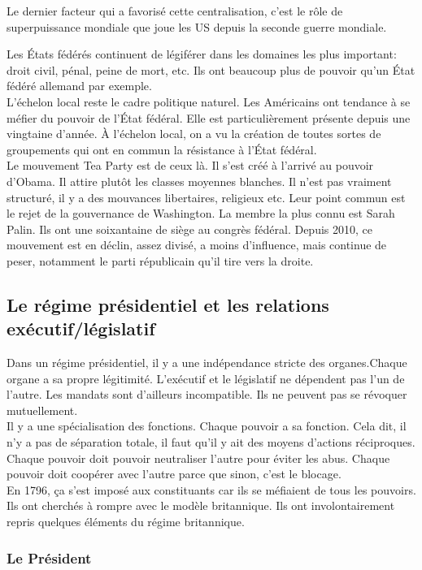 \documentclass[10pt, a4paper, openany]{book}
\begin{document}
Le dernier facteur qui a favorisé cette centralisation, c'est le rôle de superpuissance mondiale que joue les US depuis la seconde guerre mondiale. 


Les États fédérés continuent de légiférer dans les domaines les plus important: droit civil, pénal, peine de mort, etc. Ils ont beaucoup plus de pouvoir qu'un État fédéré allemand par exemple. \\
L'échelon local reste le cadre politique naturel. Les Américains ont tendance à se méfier du pouvoir de l'État fédéral. Elle est particulièrement présente depuis une vingtaine d'année. À l'échelon local, on a vu la création de toutes sortes de groupements qui ont en commun la résistance à l'État fédéral. \\
Le mouvement Tea Party est de ceux là. Il s'est créé à l'arrivé au pouvoir d'Obama. Il attire plutôt les classes moyennes blanches. Il n'est pas vraiment structuré, il y a des mouvances libertaires, religieux etc. Leur point commun est le rejet de la gouvernance de Washington. La membre la plus connu est Sarah Palin. Ils ont une soixantaine de siège au congrès fédéral. Depuis 2010, ce mouvement est en déclin, assez divisé, a moins d'influence, mais continue de peser, notamment le parti républicain qu'il tire vers la droite. 

\subsection{Le régime présidentiel et les relations exécutif/législatif}

Dans un régime présidentiel, il y a une indépendance stricte des organes.Chaque organe a sa propre légitimité. L'exécutif et le législatif ne dépendent pas l'un de l'autre. Les mandats sont d'ailleurs incompatible. Ils ne peuvent pas se révoquer mutuellement. \\
Il y a une spécialisation des fonctions. Chaque pouvoir a sa fonction. Cela dit, il n'y a pas de séparation totale, il faut qu'il y ait des moyens d'actions réciproques. Chaque pouvoir doit pouvoir neutraliser l'autre pour éviter les abus. Chaque pouvoir doit coopérer avec l'autre parce que sinon, c'est le blocage. \\
En 1796, ça s'est imposé aux constituants car ils se méfiaient de tous les pouvoirs. Ils ont cherchés à rompre avec le modèle britannique. Ils ont involontairement repris quelques éléments du régime britannique. 

\subsubsection{Le Président}
\end{document}
